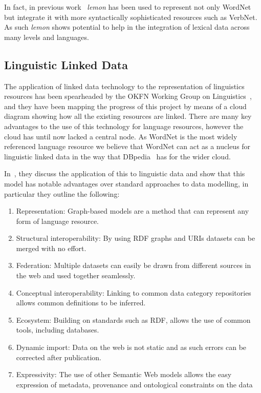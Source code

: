 \documentclass[10pt, a4paper]{article}
\newcommand{\lemon}[0]{\emph{lemon}}
\begin{document}
In fact, in previous work~\cite{eckle2014lemonuby} \lemon{} has been used to
represent not only WordNet but integrate it with more syntactically sophisticated
resources such as VerbNet. As such \lemon{} shows potential to help in the
integration of lexical data across many levels and languages.

\subsection{Linguistic Linked Data}

The application of linked data technology to the representation of linguistics
resources has been spearheaded by the OKFN Working Group on Linguistics~\cite{chiarcos2011towards},
and they have been mapping the progress of this project by means of a cloud
diagram showing how all the existing resources are linked. 
There are many key advantages to the use
of this technology for language resources, however the cloud has until now
lacked a central node. As WordNet is the most widely referenced language
resource we believe that WordNet can act as a nucleus for linguistic linked data
in the way that DBpedia~\cite{auer2007dbpedia} has for the wider cloud.

In~\cite{chiarcos2013towards}, they discuss the
application of this to linguistic data and show that this model has notable
advantages over standard approaches to data modelling, in particular they
outline the following:

\begin{enumerate}
    \item Representation: Graph-based models are a method that can represent any
        form of language resource.
    \item Structural interoperability: By using RDF graphs and URIs datasets can
        be merged with no effort.
    \item Federation: Multiple datasets can easily be drawn from different
        sources in the web and used together seamlessly.
    \item Conceptual interoperability: Linking to common data category
        repositories allows common definitions to be inferred.
    \item Ecosystem: Building on standards such as RDF, allows the use of common
        tools, including databases.
    \item Dynamic import: Data on the web is not static and as such errors can
        be corrected after publication.
    \item Expressivity: The use of other Semantic Web models allows the easy
        expression of metadata, provenance and ontological constraints on the
        data
\end{enumerate}
\end{document}
